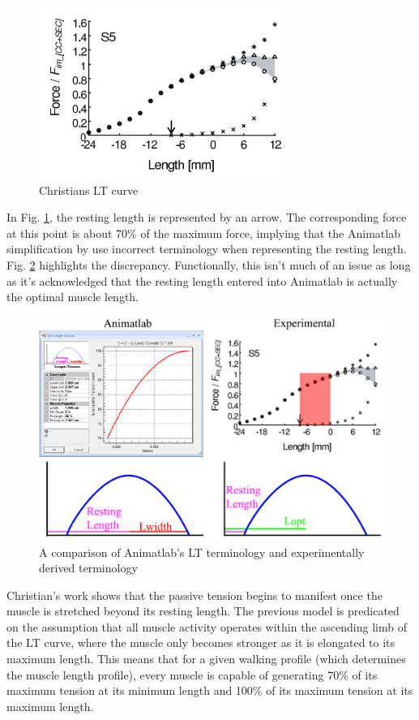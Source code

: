 \documentclass[runningheads,a4paper]{llncs}
\begin{document}
				\begin{figure}
					\centering
					\includegraphics[width=.7\textwidth]{lwidth4.PNG}
					\caption{Christians LT curve}
					\label{fig:christianLT}
				\end{figure}
		In Fig. \ref{fig:christianLT}, the resting length is represented by an arrow. The corresponding force at this point is about 70\% of the maximum force, implying that the Animatlab simplification by use incorrect terminology when representing the resting length. Fig. \ref{fig:LTcompare} highlights the discrepancy. Functionally, this isn't much of an issue as long as it's acknowledged that the resting length entered into Animatlab is actually the optimal muscle length.
				\begin{figure}
					\centering
					\includegraphics[width=.7\textwidth]{lwidth6.png}
					\caption{A comparison of Animatlab's LT terminology and experimentally derived terminology}
					\label{fig:LTcompare}
				\end{figure}
		Christian's work shows that the passive tension begins to manifest once the muscle is stretched beyond its resting length. The previous model is predicated on the assumption that all muscle activity operates within the ascending limb of the LT curve, where the muscle only becomes stronger as it is elongated to its maximum length. This means that for a given walking profile (which determines the muscle length profile), every muscle is capable of generating 70\% of its maximum tension at its minimum length and 100\% of its maximum tension at its maximum length.
\end{document}
